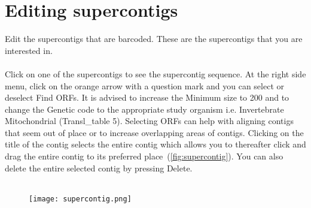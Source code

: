 \documentclass[11pt]{article}
\begin{document}
\newpage
\section{Editing supercontigs}
\label{sec:Editing}
Edit the supercontigs that are barcoded. These are the supercontigs that you are interested in. 
\\
\\
Click on one of the supercontigs to see the supercontig sequence. At the right side menu, click on the orange arrow with a question mark and you can select or deselect Find ORFs. It is advised to increase the Minimum size to 200 and to change the Genetic code to the appropriate study organism i.e. Invertebrate Mitochondrial (Transl\_table 5). Selecting ORFs can help with aligning contigs that seem out of place or to increase overlapping areas of contigs. Clicking on the title of the contig selects the entire contig which allows you to thereafter click and drag the entire contig to its preferred place~(\autoref{fig:supercontig}). You can also delete the entire selected contig by pressing Delete. 
\\
\\

\begin{figure}[H]
  \centering
    \texttt{[image: supercontig.png]}
  \label{fig:supercontig}
\end{figure}
\end{document}
